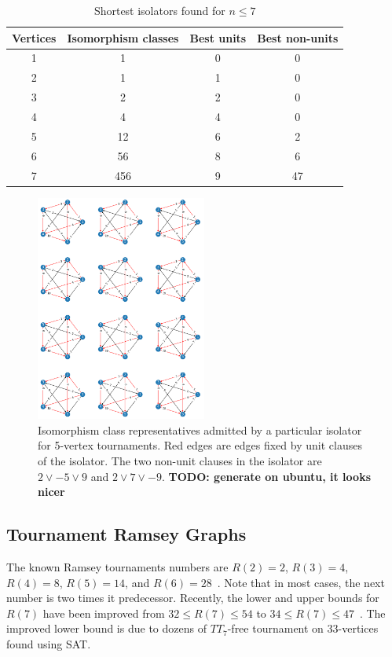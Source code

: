 \documentclass[conference]{IEEEtran}
\begin{document}
\begin{table}[ht]
    \centering
        \caption{Shortest isolators found for $n\le 7$}
    \begin{tabular}{c|c|c|c}
        Vertices & Isomorphism classes &Best units & Best non-units  \\ \hline
        1&1&0&0\\ 
        2&1&1&0\\ 
        3&2&2&0\\ 
        4&4&4&0\\
        5&12&6&2\\ 
        6&56&8&6\\ 
        7&456&9&47\\ 
    \end{tabular}

    \label{tab:smallest_isolators_found}
\end{table}

\begin{figure}
\centering
\includegraphics[width=0.5\textwidth]{iso_5.png}
\caption{Isomorphism class representatives admitted by a particular isolator for 5-vertex tournaments. Red edges are edges fixed by unit clauses of the isolator. The two non-unit clauses in the isolator are $2 \lor -5 \lor 9$ and $2 \lor 7 \lor -9$. \textbf{TODO: generate on ubuntu, it looks nicer}} \label{fig2}
\end{figure}

\subsection{Tournament Ramsey Graphs}

The known Ramsey tournaments numbers are $R(2) = 2$, $R(3) = 4$, $R(4) = 8$, $R(5) = 14$, and $R(6) = 28$~\cite{SanchezFlores54}. 
Note that in most cases, the next number is two times it predecessor.
Recently, the lower and upper bounds for $R(7)$ have been improved from $32 \leq R(7) \leq 54$ to $34 \leq R(7) \leq 47$~\cite{directedramsey}. 
The improved lower bound is due to dozens of $TT_7$-free tournament on 33-vertices found using SAT. 
\end{document}
